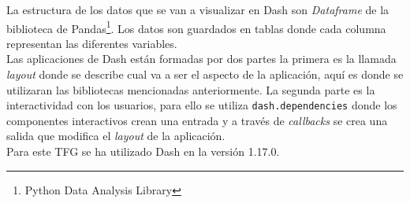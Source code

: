 La estructura de los datos que se van a visualizar en  Dash son\textit{ Dataframe} de la biblioteca de Pandas\footnote{Python Data Analysis Library}. Los datos son guardados en tablas donde cada columna representan las diferentes variables.\\

Las aplicaciones de Dash están formadas por dos partes la primera es la llamada \textit{layout} donde se describe cual va a ser el aspecto de la aplicación, aquí es donde se utilizaran las bibliotecas mencionadas anteriormente. La segunda parte es la interactividad con los usuarios, para ello se utiliza \texttt{dash.dependencies} donde los componentes interactivos crean una entrada y a través de\textit{ callbacks }se crea una salida que modifica el \textit{layout} de la aplicación.\\

Para este TFG se ha utilizado Dash en la versión 1.17.0.















